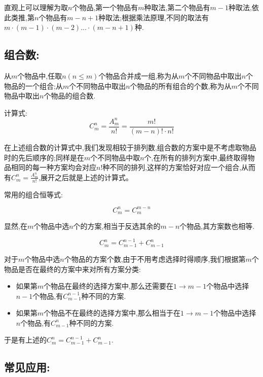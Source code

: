 \documentclass[UTF8]{article}
\begin{document}
直观上可以理解为取$n$个物品,第一个物品有$m$种取法,第二个物品有$m-1$种取法,依此类推,第$n$个物品有$m-n+1$种取法;根据乘法原理,不同的取法有$m\cdot (m-1)\cdot (m-2) ... \cdot(m-n+1)$种.

\subsection{组合数:}

从$m$个物品中,任取$n(n\leq m)$个物品合并成一组,称为从$m$个不同物品中取出$n$个物品的一个组合;从$m$个不同物品中取出$n$个物品的所有组合的个数,称为从$m$个不同物品中取出$n$个物品的组合数.

计算式:$$C_m^n = \frac{A_m^n}{n!} = \frac{m!}{(m-n)!\cdot n!}$$

在上述组合数的计算式中,我们发现相较于排列数,组合数的方案中是不考虑取物品时的先后顺序的;同样是在$m$个不同物品中取$n$个,在所有的排列方案中,最终取得物品相同的每一种方案均会对应$n!$种不同的排列,这样的方案恰好对应一个组合,从而有$C_m^n = \frac{A_m^n}{n!}$,展开之后就是上述的计算式。


常用的组合恒等式:

$$C_m^n = C_m^{m-n}$$

显然,在$m$个物品中选$n$个的方案,相当于反选其余的$m-n$个物品,其方案数也相等.

$$C_m^n = C_{m-1}^{n-1} + C_{m-1}^n$$

对于$m$个物品中选$n$个物品的方案个数,由于不用考虑选择时得顺序,我们根据第$m$个物品是否在最终的方案中来对所有方案分类:
\begin{itemize}
	\item 如果第$m$个物品在最终的选择方案中,那么还需要在$1\to m-1$个物品中选择$n-1$个物品,有$C_{m-1}^{n-1}$种不同的方案.
	\item 如果第$m$个物品不在最终的选择方案中,那么相当于在$1\to m-1$个物品中选择$n$个物品,有$C_{m-1}^n$种不同的方案.
\end{itemize}

于是有上述的$C_m^n = C_{m-1}^{n-1} + C_{m-1}^n$.

\subsection{常见应用:}
\end{document}
